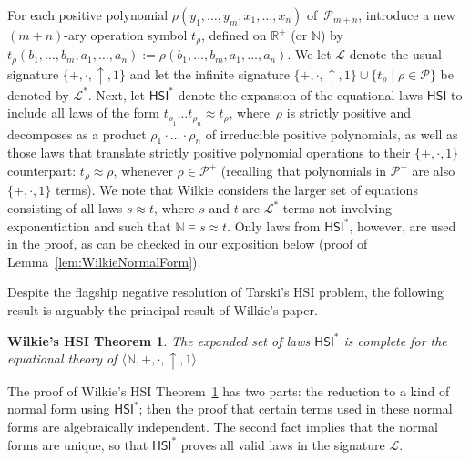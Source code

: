 \documentclass[eqnor,reqno]{amsart}
\theoremstyle{plain}
\newtheorem{WilkiesTheorem}[thm]{Wilkie's HSI Theorem}
\theoremstyle{definition}
\newcommand{\HSI}{\textsf{HSI}}
\begin{document}
For each positive polynomial $\rho(y_1,\dots,y_m,x_1,\dots,x_n)$ of~$\mathcal{P}_{m+n}$, introduce a new $(m+n)$-ary operation symbol $t_\rho$, defined on $\mathbb{R}^+$ (or $\mathbb{N}$) by $t_\rho(b_1,\dots,b_m,a_1,\dots,a_n):=\rho(b_1,\dots,b_m,a_1,\dots,a_n)$.  
We let $\mathscr{L}$ denote the usual signature $\{+,\cdot,\uparrow,1\}$ and let the infinite signature $\{+,\cdot,\uparrow,1\}\cup\{t_\rho\mid \rho\in \mathcal{P}\}$ be denoted by $\mathscr{L}^*$.  
Next, let $\HSI^*$ denote the expansion of the equational laws $\HSI$ to include all laws of the form $t_{\rho_1}\dots t_{\rho_n}\approx t_\rho$, where~$\rho$ is strictly positive and decomposes as a product $\rho_1\cdot\dots \cdot \rho_n$ of irreducible positive polynomials, as well as those laws that translate strictly positive polynomial operations to their $\{+,\cdot,1\}$ counterpart: $t_\rho\approx \rho$, whenever $\rho\in\mathcal{P}^+$ (recalling that polynomials in $\mathcal{P}^+$ are also $\{+,\cdot,1\}$ terms). 
We note that Wilkie considers the larger set of equations consisting of all laws
$s\approx t$, where $s$ and $t$ are $\mathscr{L}^*$-terms not involving exponentiation and such that $\mathbb{N}\models s\approx t$.  
Only laws from $\HSI^*$, however, are used in the proof, as can be checked in our exposition below (proof of Lemma~\ref{lem:WilkieNormalForm}).

Despite the flagship negative resolution of Tarski's HSI problem, the following result is arguably the principal result of Wilkie's paper.
\begin{WilkiesTheorem}\label{thm:WilkiesTheorem}
The expanded set of laws $\HSI^*$ is complete for the equational theory of $\langle \mathbb{N},+,\cdot,\uparrow,1\rangle$.
\end{WilkiesTheorem}
The proof of Wilkie's HSI Theorem~\ref{thm:WilkiesTheorem} has two parts: the reduction to a kind of normal form using $\HSI^*$; then the proof that certain terms used in these normal forms are algebraically independent.
The second fact implies that the normal forms are unique, so that $\HSI^*$ proves all valid laws in the signature $\mathscr{L}$.
  
\end{document}
